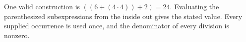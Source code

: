 One valid construction is $\boxed{((6+(4\cdot 4))+2)=24}$. Evaluating the parenthesized subexpressions from the inside out gives the stated value. Every supplied occurrence is used once, and the denominator of every division is nonzero.

